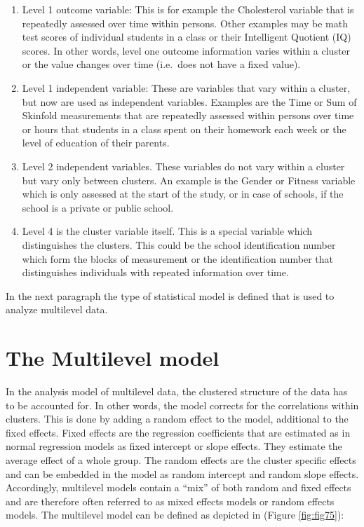 \documentclass[]{book}
\begin{document}
\begin{enumerate}
\def\labelenumi{\arabic{enumi})}
\item
  Level 1 outcome variable: This is for example the Cholesterol variable
  that is repeatedly assessed over time within persons. Other examples
  may be math test scores of individual students in a class or their
  Intelligent Quotient (IQ) scores. In other words, level one outcome
  information varies within a cluster or the value changes over time
  (i.e.~does not have a fixed value).
\item
  Level 1 independent variable: These are variables that vary within a
  cluster, but now are used as independent variables. Examples are the
  Time or Sum of Skinfold measurements that are repeatedly assessed
  within persons over time or hours that students in a class spent on
  their homework each week or the level of education of their parents.
\item
  Level 2 independent variables. These variables do not vary within a
  cluster but vary only between clusters. An example is the Gender or
  Fitness variable which is only assessed at the start of the study, or
  in case of schools, if the school is a private or public school.
\item
  Level 4 is the cluster variable itself. This is a special variable
  which distinguishes the clusters. This could be the school
  identification number which form the blocks of measurement or the
  identification number that distinguishes individuals with repeated
  information over time.
\end{enumerate}

In the next paragraph the type of statistical model is defined that is
used to analyze multilevel data.

\section{The Multilevel model}\label{the-multilevel-model}

In the analysis model of multilevel data, the clustered structure of the
data has to be accounted for. In other words, the model corrects for the
correlations within clusters. This is done by adding a random effect to
the model, additional to the fixed effects. Fixed effects are the
regression coefficients that are estimated as in normal regression
models as fixed intercept or slope effects. They estimate the average
effect of a whole group. The random effects are the cluster specific
effects and can be embedded in the model as random intercept and random
slope effects. Accordingly, multilevel models contain a ``mix'' of both
random and fixed effects and are therefore often referred to as mixed
effects models or random effects models. The multilevel model can be
defined as depicted in (Figure \ref{fig:fig75}):
\end{document}
